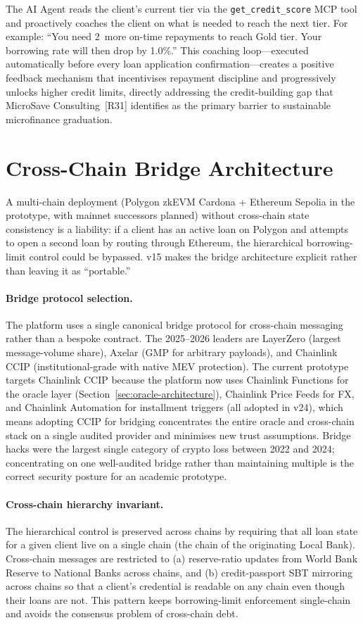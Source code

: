 \documentclass[12pt,a4paper]{report}
\begin{document}
The AI Agent reads the client's current tier via the \texttt{get\_credit\_score} MCP tool and proactively coaches the client on what is needed to reach the next tier. For example: ``You need 2~more on-time repayments to reach Gold tier. Your borrowing rate will then drop by 1.0\%.'' This coaching loop---executed automatically before every loan application confirmation---creates a positive feedback mechanism that incentivises repayment discipline and progressively unlocks higher credit limits, directly addressing the credit-building gap that MicroSave Consulting~[R31] identifies as the primary barrier to sustainable microfinance graduation.

\section{Cross-Chain Bridge Architecture}
\label{sec:bridge}

A multi-chain deployment (Polygon zkEVM Cardona + Ethereum Sepolia in the prototype, with mainnet successors planned) without cross-chain state consistency is a liability: if a client has an active loan on Polygon and attempts to open a second loan by routing through Ethereum, the hierarchical borrowing-limit control could be bypassed. v15 makes the bridge architecture explicit rather than leaving it as ``portable.''

\paragraph{Bridge protocol selection.}
The platform uses a single canonical bridge protocol for cross-chain messaging rather than a bespoke contract. The 2025--2026 leaders are LayerZero (largest message-volume share), Axelar (GMP for arbitrary payloads), and Chainlink CCIP (institutional-grade with native MEV protection). The current prototype targets Chainlink CCIP because the platform now uses Chainlink Functions for the oracle layer (Section~\ref{sec:oracle-architecture}), Chainlink Price Feeds for FX, and Chainlink Automation for installment triggers (all adopted in v24), which means adopting CCIP for bridging concentrates the entire oracle and cross-chain stack on a single audited provider and minimises new trust assumptions. Bridge hacks were the largest single category of crypto loss between 2022 and 2024; concentrating on one well-audited bridge rather than maintaining multiple is the correct security posture for an academic prototype.

\paragraph{Cross-chain hierarchy invariant.}
The hierarchical control is preserved across chains by requiring that all loan state for a given client live on a single chain (the chain of the originating Local Bank). Cross-chain messages are restricted to (a) reserve-ratio updates from World Bank Reserve to National Banks across chains, and (b) credit-passport SBT mirroring across chains so that a client's credential is readable on any chain even though their loans are not. This pattern keeps borrowing-limit enforcement single-chain and avoids the consensus problem of cross-chain debt.
\end{document}
